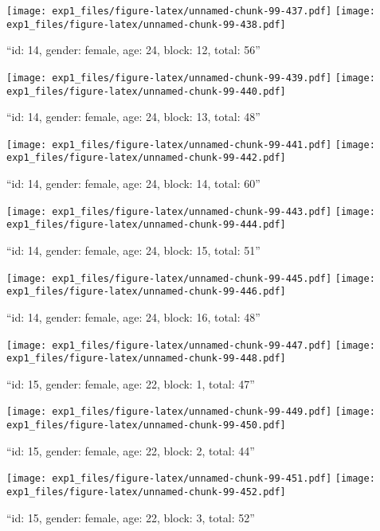 \documentclass[,]{article}
\begin{document}
\texttt{[image: exp1\_files/figure-latex/unnamed-chunk-99-437.pdf]}
\texttt{[image: exp1\_files/figure-latex/unnamed-chunk-99-438.pdf]}

\newpage
[1] 

``id: 14, gender: female, age: 24, block: 12, total: 56''

\texttt{[image: exp1\_files/figure-latex/unnamed-chunk-99-439.pdf]}
\texttt{[image: exp1\_files/figure-latex/unnamed-chunk-99-440.pdf]}

\newpage
[1] 

``id: 14, gender: female, age: 24, block: 13, total: 48''

\texttt{[image: exp1\_files/figure-latex/unnamed-chunk-99-441.pdf]}
\texttt{[image: exp1\_files/figure-latex/unnamed-chunk-99-442.pdf]}

\newpage
[1] 

``id: 14, gender: female, age: 24, block: 14, total: 60''

\texttt{[image: exp1\_files/figure-latex/unnamed-chunk-99-443.pdf]}
\texttt{[image: exp1\_files/figure-latex/unnamed-chunk-99-444.pdf]}

\newpage
[1] 

``id: 14, gender: female, age: 24, block: 15, total: 51''

\texttt{[image: exp1\_files/figure-latex/unnamed-chunk-99-445.pdf]}
\texttt{[image: exp1\_files/figure-latex/unnamed-chunk-99-446.pdf]}

\newpage
[1] 

``id: 14, gender: female, age: 24, block: 16, total: 48''

\texttt{[image: exp1\_files/figure-latex/unnamed-chunk-99-447.pdf]}
\texttt{[image: exp1\_files/figure-latex/unnamed-chunk-99-448.pdf]}

\newpage
[1] 

``id: 15, gender: female, age: 22, block: 1, total: 47''

\texttt{[image: exp1\_files/figure-latex/unnamed-chunk-99-449.pdf]}
\texttt{[image: exp1\_files/figure-latex/unnamed-chunk-99-450.pdf]}

\newpage
[1] 

``id: 15, gender: female, age: 22, block: 2, total: 44''

\texttt{[image: exp1\_files/figure-latex/unnamed-chunk-99-451.pdf]}
\texttt{[image: exp1\_files/figure-latex/unnamed-chunk-99-452.pdf]}

\newpage
[1] 

``id: 15, gender: female, age: 22, block: 3, total: 52''
\end{document}
